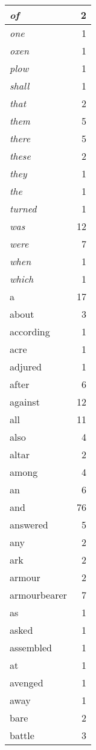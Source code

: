 \begin{center}
\begin{longtable}{l|r}
\emph{of} & 2 \\ \hline
\emph{one} & 1 \\ \hline
\emph{oxen} & 1 \\ \hline
\emph{plow} & 1 \\ \hline
\emph{shall} & 1 \\ \hline
\emph{that} & 2 \\ \hline
\emph{them} & 5 \\ \hline
\emph{there} & 5 \\ \hline
\emph{these} & 2 \\ \hline
\emph{they} & 1 \\ \hline
\emph{the} & 1 \\ \hline
\emph{turned} & 1 \\ \hline
\emph{was} & 12 \\ \hline
\emph{were} & 7 \\ \hline
\emph{when} & 1 \\ \hline
\emph{which} & 1 \\ \hline
a & 17 \\ \hline
about & 3 \\ \hline
according & 1 \\ \hline
acre & 1 \\ \hline
adjured & 1 \\ \hline
after & 6 \\ \hline
against & 12 \\ \hline
all & 11 \\ \hline
also & 4 \\ \hline
altar & 2 \\ \hline
among & 4 \\ \hline
an & 6 \\ \hline
and & 76 \\ \hline
answered & 5 \\ \hline
any & 2 \\ \hline
ark & 2 \\ \hline
armour & 2 \\ \hline
armourbearer & 7 \\ \hline
as & 1 \\ \hline
asked & 1 \\ \hline
assembled & 1 \\ \hline
at & 1 \\ \hline
avenged & 1 \\ \hline
away & 1 \\ \hline
bare & 2 \\ \hline
battle & 3 \\ \hline

\end{longtable}
\end{center}
